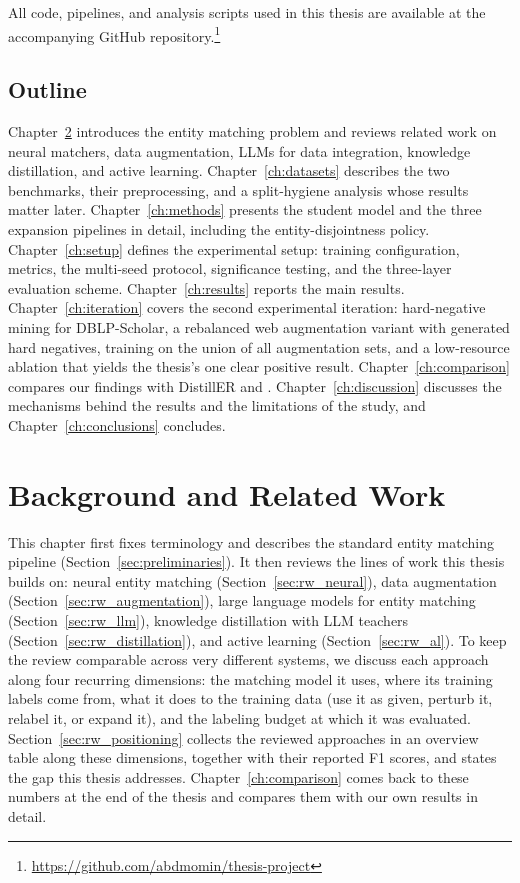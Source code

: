 \documentclass[a4paper,oneside,bibliography=totoc]{scrbook}
\begin{document}
All code, pipelines, and analysis scripts used in this thesis are available at the accompanying GitHub repository.\footnote{\url{https://github.com/abdmomin/thesis-project}}

\section{Outline}
\label{sec:outline}

Chapter~\ref{ch:related_work} introduces the entity matching problem and reviews related work on neural matchers, data augmentation, LLMs for data integration, knowledge distillation, and active learning. Chapter~\ref{ch:datasets} describes the two benchmarks, their preprocessing, and a split-hygiene analysis whose results matter later. Chapter~\ref{ch:methods} presents the student model and the three expansion pipelines in detail, including the entity-disjointness policy. Chapter~\ref{ch:setup} defines the experimental setup: training configuration, metrics, the multi-seed protocol, significance testing, and the three-layer evaluation scheme. Chapter~\ref{ch:results} reports the main results. Chapter~\ref{ch:iteration} covers the second experimental iteration: hard-negative mining for DBLP-Scholar, a rebalanced web augmentation variant with generated hard negatives, training on the union of all augmentation sets, and a low-resource ablation that yields the thesis's one clear positive result. Chapter~\ref{ch:comparison} compares our findings with DistillER and \citet{steiner2026labeling}. Chapter~\ref{ch:discussion} discusses the mechanisms behind the results and the limitations of the study, and Chapter~\ref{ch:conclusions} concludes.

\chapter{Background and Related Work}
\label{ch:related_work}

This chapter first fixes terminology and describes the standard entity matching pipeline (Section~\ref{sec:preliminaries}). It then reviews the lines of work this thesis builds on: neural entity matching (Section~\ref{sec:rw_neural}), data augmentation (Section~\ref{sec:rw_augmentation}), large language models for entity matching (Section~\ref{sec:rw_llm}), knowledge distillation with LLM teachers (Section~\ref{sec:rw_distillation}), and active learning (Section~\ref{sec:rw_al}). To keep the review comparable across very different systems, we discuss each approach along four recurring dimensions: the matching model it uses, where its training labels come from, what it does to the training data (use it as given, perturb it, relabel it, or expand it), and the labeling budget at which it was evaluated. Section~\ref{sec:rw_positioning} collects the reviewed approaches in an overview table along these dimensions, together with their reported F1 scores, and states the gap this thesis addresses. Chapter~\ref{ch:comparison} comes back to these numbers at the end of the thesis and compares them with our own results in detail.
\end{document}
